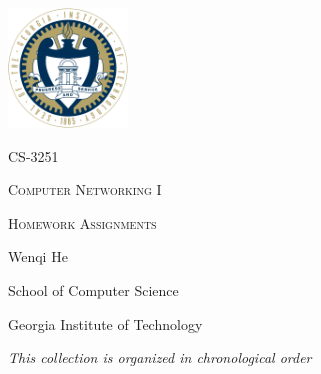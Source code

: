 \documentclass[10pt]{article}
\begin{document}
\begin{titlepage}
	\centering
	\par
	\vspace{5cm}
	\includegraphics[width=120px]{logo.png}\par
	\vspace{3cm}
	{\scshape\Large CS-3251\par}
	{\Huge\scshape Computer Networking I \par}
	\vspace{0.3cm}
	{\scshape\LARGE Homework Assignments \par}
	\vspace{2cm}
	\vfill
	{\Large Wenqi He\par}
	\vspace{0.3cm}
	{\Large School of Computer Science\par}	
	\vspace{0.3cm}
	{\Large Georgia Institute of Technology \par}
	\vfill
	{\large\itshape This collection is organized in chronological order}
\end{titlepage}
\end{document}
